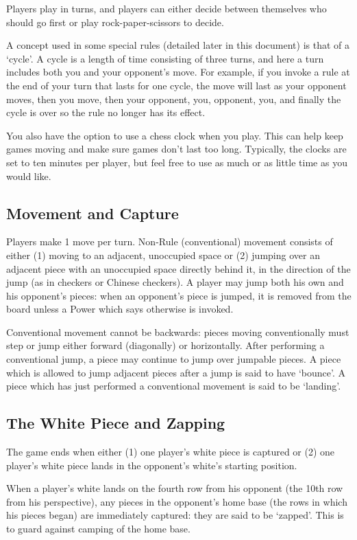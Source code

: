 \documentclass[../rulebook.tex]{subfiles}
\begin{document}
Players play in turns, and players can either decide between themselves
who should go first or play rock-paper-scissors to decide.

A concept used in some special rules (detailed later in this document)
is that of a `cycle'.
A cycle is a length of time consisting of three turns,
and here a turn includes both you and your opponent's move.
For example, if you invoke a rule at the end of your turn that lasts
for one cycle, the move will last as your opponent moves, then you move,
then your opponent, you, opponent, you, and finally the cycle is over so
the rule no longer has its effect.



You also have the option to use a chess clock when you play.
This can help keep games moving and make sure games don't last too long.
Typically, the clocks are set to ten minutes per player,
but feel free to use as much or as little time as you would like.


\subsection*{Movement and Capture}
Players make 1 move per turn.
Non-Rule (conventional) movement consists of either
(1) moving to an adjacent, unoccupied space or
(2) jumping over an adjacent piece with an unoccupied
space directly behind it, in the direction of the jump
(as in checkers or Chinese checkers).
A player may jump both his own and his opponent's pieces:
when an opponent's piece is jumped, it is removed from the board
unless a Power which says otherwise is invoked.

Conventional movement cannot be backwards:
pieces moving conventionally must step or jump either forward
(diagonally) or horizontally.
After performing a conventional jump,
a piece may continue to jump over jumpable pieces.
A piece which is allowed to jump adjacent pieces after a jump
is said to have `bounce'.
A piece which has just performed a conventional movement
is said to be `landing'.

\subsection*{The White Piece and Zapping}
The game ends when either (1) one player's white piece is captured or
(2) one player's white piece lands in the opponent's
white's starting position.

When a player's white lands on the fourth row from his opponent
(the 10th row from his perspective),
any pieces in the opponent's home base
(the rows in which his pieces began) are immediately captured:
they are said to be `zapped'.
This is to guard against camping of the home base.
\end{document}
